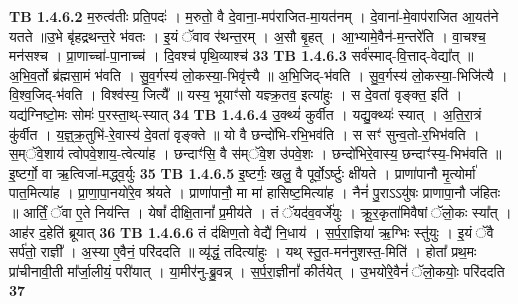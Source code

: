 \documentclass[17pt]{extarticle}
\begin{document}
                  \newline
                                \textbf{ TB 1.4.6.2} \newline
                  म॒रुत्व॑तीः प्रति॒पदः॑ । म॒रुतो॒ वै दे॒वाना॒-मप॑राजित-मा॒यत॑नम् । दे॒वाना॑-मे॒वाप॑राजित आ॒यत॑ने यतते ॥उ॒भे बृ॑हद्रथन्त॒रे भ॑वतः । इ॒यं ॅवाव र॑थन्त॒रम् । अ॒सौ बृ॒हत् । आ॒भ्यामे॒वैन॑-म॒न्तरे॑ति । वा॒चश्च॒ मन॑सश्च । प्रा॒णाच्चा॑-पा॒नाच्च॑ । दि॒वश्च॑ पृथि॒व्याश्च॑ \textbf{ 33} \newline
                  \newline
                                \textbf{ TB 1.4.6.3} \newline
                  सर्व॑स्माद्-वि॒त्ताद्-वेद्या᳚त् ॥ अ॒भि॒व॒र्तो ब्र॑ह्मसा॒मं भ॑वति । सु॒व॒र्गस्य॑ लो॒कस्या॒-भिवृ॑त्त्यै ॥ अ॒भि॒जिद्-भ॑वति । सु॒व॒र्गस्य॑ लो॒कस्या॒-भिजि॑त्यै । वि॒श्व॒जिद्-भ॑वति । विश्व॑स्य॒ जित्यै᳚ ॥ यस्य॒ भूयाꣳ॑सो यज्ञ्क्र॒तव॒ इत्या॑हुः । स दे॒वता॑ वृङ्क्त॒ इति॑ । यद्य॑ग्निष्टो॒मः सोमः॑ प॒रस्ता॒थ्-स्यात् \textbf{ 34} \newline
                  \newline
                                \textbf{ TB 1.4.6.4} \newline
                  उ॒॒क्थ्यं॑ कुर्वीत । यद्यु॒क्थ्यः॑ स्यात् । अ॒ति॒रा॒त्रं कु॑र्वीत । य॒ज्ञ्॒क्र॒तुभि॑-रे॒वास्य॑ दे॒वता॑ वृङ्क्ते ॥ यो वै छन्दो॑भि-रभि॒भव॑ति । स सꣳ॑ सुन्व॒तो-र॒भिभ॑वति । स॒म्ॅवे॒शाय॑ त्वोपवे॒शाय॒-त्वेत्या॑ह । छन्दाꣳ॑सि॒ वै स॑म्ॅवे॒श उ॑पवे॒शः । छन्दो॑भिरे॒वास्य॒ छन्दाꣳ॑स्य॒-भिभ॑वति ॥ इ॒ष्टर्गो॒ वा ऋ॒त्विजा॑-मद्ध्व॒र्युः \textbf{ 35} \newline
                  \newline
                                \textbf{ TB 1.4.6.5} \newline
                  इ॒ष्टर्गः॒ खलु॒ वै पूर्वो॒ऽर्ष्टुः क्षी॑यते । प्राणा॑पानौ मृ॒त्योर्मा॑ पात॒मित्या॑ह । प्रा॒णा॒पा॒नयो॑रे॒व श्र॑यते । प्राणा॑पानौ॒ मा मा॑ हासिष्ट॒मित्या॑ह । नैनं॑ पु॒राऽऽयु॑षः प्राणापा॒नौ ज॑हितः ॥ आर्तिं॒ ॅवा ए॒ते निय॑न्ति । येषां᳚ दीक्षि॒तानां᳚ प्र॒मीय॑ते । तं ॅयद॑व॒वर्जे॑युः । क्रू॒र॒कृता॑मिवैषां ॅलो॒कः स्या᳚त् । आह॑र द॒हेति॑ ब्रूयात् \textbf{ 36} \newline
                  \newline
                                \textbf{ TB 1.4.6.6} \newline
                  तं द॑क्षिण॒तो वेद्यै॑ नि॒धाय॑ । स॒र्प॒रा॒ज्ञिया॑ ऋ॒ग्भिः स्तु॑युः । इ॒यं ॅवै सर्प॑तो॒ राज्ञी᳚ । अ॒स्या ए॒वैनं॒ परि॑ददति ॥ व्यृ॑द्धं॒ तदित्या॑हुः । यथ् स्तु॒त-मन॑नुशस्त॒-मिति॑ । होता᳚ प्रथ॒मः प्रा॑चीनावी॒ती मा᳚र्जा॒लीयं॒ परी॑यात् । या॒मीर॑नु-ब्रु॒वन्न् । स॒र्प॒रा॒ज्ञीनां᳚ कीर्तयेत् । उ॒भयो॑रे॒वैनं॑ ॅलो॒कयोः॒ परि॑ददति \textbf{ 37} \newline
\end{document}

